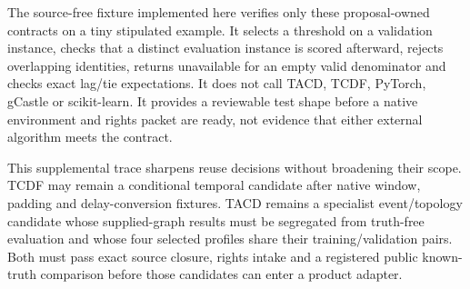 The source-free fixture implemented here verifies only these proposal-owned contracts on a tiny
stipulated example. It selects a threshold on a validation instance, checks that a distinct
evaluation instance is scored afterward, rejects overlapping identities, returns unavailable
for an empty valid denominator and checks exact lag/tie expectations. It does not call TACD,
TCDF, PyTorch, gCastle or scikit-learn. It provides a reviewable test shape before a native
environment and rights packet are ready, not evidence that either external algorithm meets the
contract.

This supplemental trace sharpens reuse decisions without broadening their scope. TCDF may remain
a conditional temporal candidate after native window, padding and delay-conversion fixtures.
TACD remains a specialist event/topology candidate whose supplied-graph results must be segregated
from truth-free evaluation and whose four selected profiles share their training/validation pairs.
Both must pass exact source closure, rights intake and a registered public known-truth comparison
before those candidates can enter a product adapter.
